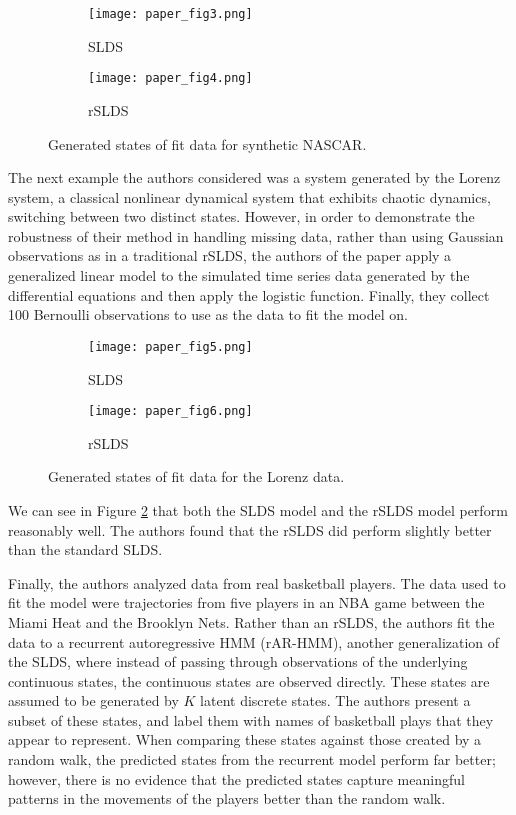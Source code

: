 \begin{figure}[h!]
	\centering
	\begin{subfigure}[b]{0.35\textwidth}
		\texttt{[image: paper\_fig3.png]}
		\caption{SLDS}
	\end{subfigure}
	\begin{subfigure}[b]{0.35\textwidth}
		\texttt{[image: paper\_fig4.png]}
		\caption{rSLDS}
	\end{subfigure}
	\caption{Generated states of fit data for synthetic NASCAR.}
	\label{Nascargen}
\end{figure}

The next example the authors considered was a system generated by the Lorenz system, a classical nonlinear dynamical system that exhibits chaotic dynamics, switching between two distinct states. However, in order to demonstrate the robustness of their method in handling missing data, rather than using Gaussian observations as in a traditional rSLDS, the authors of the paper apply a generalized linear model to the simulated time series data generated by the differential equations and then apply the logistic function. Finally, they collect 100 Bernoulli observations to use as the data to fit the model on.

\begin{figure}[h!]
	\centering
	\begin{subfigure}[b]{0.35\textwidth}
		\texttt{[image: paper\_fig5.png]}
		\caption{SLDS}
	\end{subfigure}
	\begin{subfigure}[b]{0.35\textwidth}
		\texttt{[image: paper\_fig6.png]}
		\caption{rSLDS}
	\end{subfigure}
	\caption{Generated states of fit data for the Lorenz data.}
	\label{Lorenzgen}
\end{figure}

We can see in Figure \ref{Lorenzgen} that both the SLDS model and the rSLDS model perform reasonably well. The authors found that the rSLDS did perform slightly better than the standard SLDS.

Finally, the authors analyzed data from real basketball players. The data used to fit the model were trajectories from five players in an NBA game between the Miami Heat and the Brooklyn Nets. Rather than an rSLDS, the authors fit the data to a recurrent autoregressive HMM (rAR-HMM), another generalization of the SLDS, where instead of passing through observations of the underlying continuous states, the continuous states are observed directly. These states are assumed to be generated by $K$ latent discrete states. The authors present a subset of these states, and label them with names of basketball plays that they appear to represent. When comparing these states against those created by a random walk, the predicted states from the recurrent model perform far better; however, there is no evidence that the predicted states capture meaningful patterns in the movements of the players better than the random walk.

